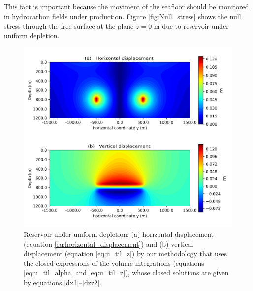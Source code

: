 \documentclass[P]{BrJG_submit}
\begin{document}
This fact is important because the moviment of the seafloor should be monitored in hydrocarbon fields under production.
Figure \ref{fig:Null_stress} shows the null stress through the free surface at the plane $z=0$ m due to reservoir under uniform depletion.
\begin{figure}[h]
    \centering
    \includegraphics[scale=0.40]{figures/Figure_Displacement.png}
    \caption{Reservoir under uniform depletion: (a) horizontal displacement (equation 
	\ref{eq:horizontal_displacement}) and (b) vertical displacement (equation \ref{eq:u_til_z}) by our 
	methodology that uses the closed expressions of the volume integrations (equations \ref{eq:u_til_alpha} 
	and \ref{eq:u_til_z}), whose closed solutions are given by equations \ref{dx1}--\ref{dzz2}.}
	\label{fig:displacement}
\end{figure}
\vspace{0.00mm} 
\end{document}
